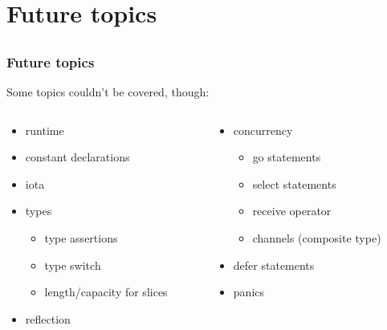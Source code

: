 \section{Future topics}
\subsection*{}

\begin{frame}[t]
  \frametitle{Future topics}

  Some topics couldn't be covered, though:

  \begin{columns}[T]
    \begin{column}{0.5\linewidth}
      \begin{itemize}
      \item runtime
      \item constant declarations
      \item iota
      \item types

        \begin{itemize}
        \item type assertions
        \item type switch
        \item length/capacity for slices
        \end{itemize}
      \item reflection
      \end{itemize}
    \end{column}
    \begin{column}{0.5\linewidth}
      \begin{itemize}
      \item concurrency

        \begin{itemize}
        \item go statements
        \item select statements
        \item receive operator
        \item channels (composite type)
        \end{itemize}
      \item defer statements
      \item panics
      \end{itemize}
    \end{column}
  \end{columns}
\end{frame}

